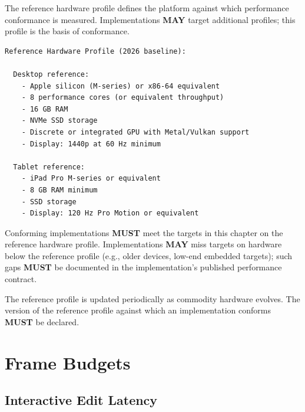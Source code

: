 \documentclass[11pt,letterpaper]{report}
\newcounter{requirement}[chapter]
\newcommand{\MUST}{\textbf{MUST}}
\newcommand{\MAY}{\textbf{MAY}}
\begin{document}
The reference hardware profile defines the platform against which
performance conformance is measured. Implementations \MAY{} target
additional profiles; this profile is the basis of conformance.

\begin{lstlisting}
Reference Hardware Profile (2026 baseline):

  Desktop reference:
    - Apple silicon (M-series) or x86-64 equivalent
    - 8 performance cores (or equivalent throughput)
    - 16 GB RAM
    - NVMe SSD storage
    - Discrete or integrated GPU with Metal/Vulkan support
    - Display: 1440p at 60 Hz minimum

  Tablet reference:
    - iPad Pro M-series or equivalent
    - 8 GB RAM minimum
    - SSD storage
    - Display: 120 Hz Pro Motion or equivalent
\end{lstlisting}

\begin{requirement}
  \label{req:perf:reference-hardware}
  Conforming implementations \MUST{} meet the targets in this chapter
  on the reference hardware profile. Implementations \MAY{} miss
  targets on hardware below the reference profile (e.g., older
  devices, low-end embedded targets); such gaps \MUST{} be documented
  in the implementation's published performance contract.

  The reference profile is updated periodically as commodity hardware
  evolves. The version of the reference profile against which an
  implementation conforms \MUST{} be declared.
\end{requirement}

\section{Frame Budgets}
\label{sec:perf:frame}

\subsection{Interactive Edit Latency}
\end{document}
